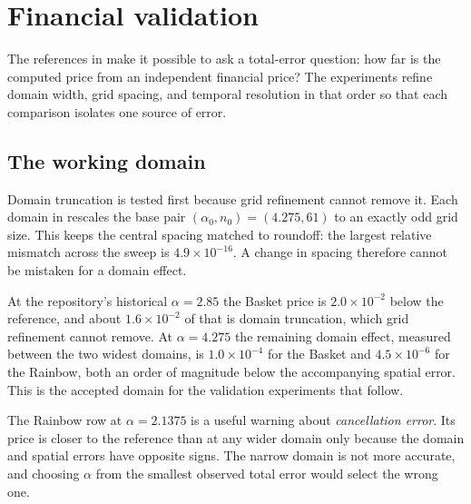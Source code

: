 \section{Financial validation}\label{sec:validation}

The references in  make it possible to ask a total-error question: how far is the computed price from an independent financial price? The experiments refine domain width, grid spacing, and temporal resolution in that order so that each comparison isolates one source of error.

\subsection{The working domain}\label{sec:validation-domain}

Domain truncation is tested first because grid refinement cannot remove it. Each domain in  rescales the base pair $(\alpha_0,n_0)=(4.275,61)$ to an exactly odd grid size. This keeps the central spacing matched to roundoff: the largest relative mismatch across the sweep is $4.9\times10^{-16}$. A change in spacing therefore cannot be mistaken for a domain effect.

At the repository's historical $\alpha = 2.85$ the Basket price is $2.0\times10^{-2}$ below the reference, and about $1.6\times10^{-2}$ of that is domain truncation, which grid refinement cannot remove. At $\alpha = 4.275$ the remaining domain effect, measured between the two widest domains, is $1.0\times10^{-4}$ for the Basket and $4.5\times10^{-6}$ for the Rainbow, both an order of magnitude below the accompanying spatial error. This is the accepted domain for the validation experiments that follow.

The Rainbow row at $\alpha=2.1375$ is a useful warning about \emph{cancellation error}. Its price is closer to the reference than at any wider domain only because the domain and spatial errors have opposite signs. The narrow domain is not more accurate, and choosing $\alpha$ from the smallest observed total error would select the wrong one.

